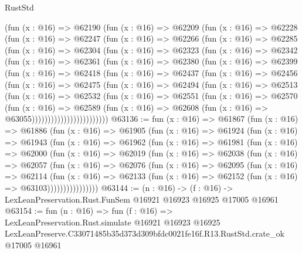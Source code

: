 \begin{lexlean}{RustStd}
\begin{coremodule}
    (fun (x : @16) =>
    @62190
      (fun (x : @16) =>
      @62209
        (fun (x : @16) =>
        @62228
          (fun (x : @16) =>
          @62247
            (fun (x : @16) =>
            @62266
              (fun (x : @16) =>
              @62285
                (fun (x : @16) =>
                @62304
                  (fun (x : @16) =>
                  @62323
                    (fun (x : @16) =>
                    @62342
                      (fun (x : @16) =>
                      @62361
                        (fun (x : @16) =>
                        @62380
                          (fun (x : @16) =>
                          @62399
                            (fun (x : @16) =>
                            @62418
                              (fun (x : @16) =>
                              @62437
                                (fun (x : @16) =>
                                @62456
                                  (fun (x : @16) =>
                                  @62475
                                    (fun (x : @16) =>
                                    @62494
                                      (fun (x : @16) =>
                                      @62513
                                        (fun (x : @16) =>
                                        @62532
                                          (fun (x : @16) =>
                                          @62551
                                            (fun (x : @16) =>
                                            @62570
                                              (fun (x : @16) =>
                                              @62589
                                                (fun (x : @16) =>
                                                @62608
                                                  (fun (x : @16) => @63055))))))))))))))))))))))))
@63136 := fun (x : @16) =>
  @61867
    (fun (x : @16) =>
    @61886
      (fun (x : @16) =>
      @61905
        (fun (x : @16) =>
        @61924
          (fun (x : @16) =>
          @61943
            (fun (x : @16) =>
            @61962
              (fun (x : @16) =>
              @61981
                (fun (x : @16) =>
                @62000
                  (fun (x : @16) =>
                  @62019
                    (fun (x : @16) =>
                    @62038
                      (fun (x : @16) =>
                      @62057
                        (fun (x : @16) =>
                        @62076
                          (fun (x : @16) =>
                          @62095
                            (fun (x : @16) =>
                            @62114
                              (fun (x : @16) =>
                              @62133
                                (fun (x : @16) => @62152 (fun (x : @16) => @63103))))))))))))))))
@63144 := (n : @16) ->
  (f : @16) -> LexLeanPreservation.Rust.FunSem @16921 @16923 @16925 @17005 @16961
@63154 := fun (n : @16) =>
  fun (f : @16) =>
  LexLeanPreservation.Rust.simulate
    @16921
    @16923
    @16925
    LexLeanPreserve.C33071485b35d373d309bfdc0021fe16f.R13.RustStd.crate_ok
    @17005
    @16961
\end{coremodule}
\end{lexlean}
